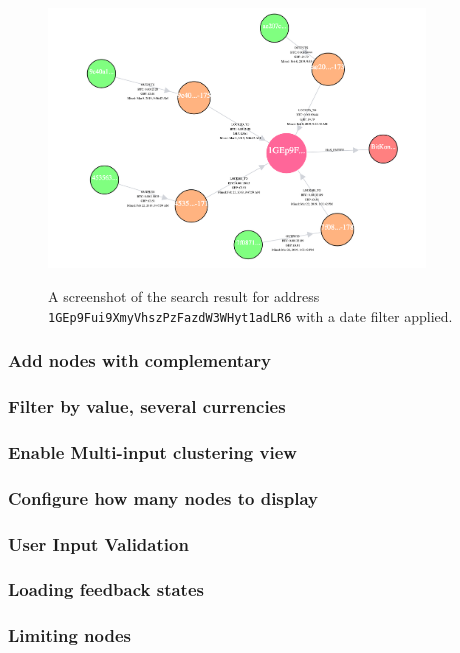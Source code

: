 \begin{figure}[h!]
  \centering
  \includegraphics[width = 10cm]{./figures/ui-screenshots/time-filter-result-2019}\\[0.5cm] 
  \caption{A screenshot of the search result for address \texttt{1GEp9Fui9XmyVhszPzFazdW3WHyt1adLR6} with a date filter applied.}
  \label{fig:date-time-filter-with}
\end{figure}


\subsubsection{Add nodes with complementary}


\subsubsection{Filter by value, several currencies}

\subsubsection{Enable Multi-input clustering view}

\subsubsection{Configure how many nodes to display}

\subsubsection{User Input Validation}

\subsubsection{Loading feedback states}

\subsubsection{Limiting nodes}

